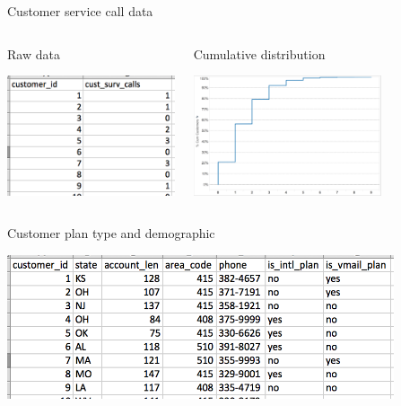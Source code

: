\documentclass[10pt]{beamer}
\begin{document}
    \begin{frame}{Customer service call data}
        \begin{columns}[c]
          \begin{block}{Raw data}
            \begin{center}
              \includegraphics[height=100pt]{graphs/dataset_customer_support}
            \end{center}
          \end{block}
          \begin{block}{Cumulative distribution}
            \begin{center}
              \includegraphics[height=100pt]{graphs/dataset_cust_call_chart}
            \end{center}
          \end{block}
        \end{columns}
    \end{frame}

    \begin{frame}{Customer plan type and demographic}
        \begin{center}
          \includegraphics[height=120pt]{graphs/dataset_customer_account}
        \end{center}
    \end{frame}
\end{document}
